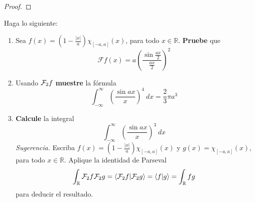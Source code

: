 \documentclass[12pt]{report}
\theoremstyle{largebreak}
\newcommand\abs[1]{\ensuremath{\left|#1\right|}}
\newcommand\pint[2]{\ensuremath{\langle#1| #2\rangle}}
\newcommand{\fou}[1]{\ensuremath{\mathcal{F}#1}}
\begin{document}
    \begin{proof}
        
    \end{proof}

    \begin{excer}
        Haga lo siguiente:
        \begin{enumerate}
            \item Sea $f(x)=\left(1-\frac{\abs{x}}{a}\right)\chi_{[-a,a]}(x)$, para todo $x\in\mathbb{R}$. \textbf{Pruebe } que
            \begin{equation*}
                \fou{f}(x)=a\left(\frac{\sin\frac{ax}{2}}{\frac{ax}{2}}\right)^2
            \end{equation*}
            \item Usando $\fou_2{f}$ \textbf{muestre} la fórmula
            \begin{equation*}
                \int_{-\infty }^{\infty}\left(\frac{\sin ax}{x} \right)^4\:dx=\frac{2}{3}\pi a^3
            \end{equation*}
            \item \textbf{Calcule} la integral
            \begin{equation*}
                \int_{-\infty}^{\infty}\left(\frac{\sin ax}{x}\right)^3\:dx
            \end{equation*}
            \textit{Sugerencia.} Escriba $f(x)=\left(1-\frac{\abs{x}}{a} \right)\chi_[-a,a](x)$ y $g(x)=\chi_{[-a,a]}(x)$, para todo $x\in\mathbb{R}$. Aplique la identidad de Parseval
            \begin{equation*}
                \int_\mathbb{R}\fou_2{f}\fou_2{g}=\pint{\fou_2{f}}{\fou_2{g}}=\pint{f}{g}=\int_{\mathbb{R}}fg
            \end{equation*}
            para deducir el resultado.
        \end{enumerate}
    \end{excer}

    \begin{sol}
        
    \end{sol}
\end{document}
